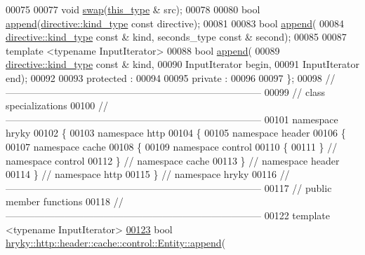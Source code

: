 \begin{DoxyCode}
00075 
00077     \textcolor{keywordtype}{void} \hyperlink{classhryky_1_1http_1_1header_1_1cache_1_1control_1_1_entity_afa2f3b06ff23758c01896c4bdfa81942}{swap}(\hyperlink{classhryky_1_1http_1_1header_1_1cache_1_1control_1_1_entity}{this_type} & src);
00078 
00080     \textcolor{keywordtype}{bool} \hyperlink{classhryky_1_1http_1_1header_1_1cache_1_1control_1_1_entity_ab9a90afb6b1ed5125e7e7648f910f8f7}{append}(\hyperlink{classhryky_1_1_kind}{directive::kind_type} \textcolor{keyword}{const} directive);
00081 
00083     \textcolor{keywordtype}{bool} \hyperlink{classhryky_1_1http_1_1header_1_1cache_1_1control_1_1_entity_ab9a90afb6b1ed5125e7e7648f910f8f7}{append}(
00084         \hyperlink{classhryky_1_1_kind}{directive::kind_type} \textcolor{keyword}{const} & kind, seconds\_type \textcolor{keyword}{const} & second);
00085 
00087     \textcolor{keyword}{template} <\textcolor{keyword}{typename} InputIterator>
00088     \textcolor{keywordtype}{bool} \hyperlink{classhryky_1_1http_1_1header_1_1cache_1_1control_1_1_entity_ab9a90afb6b1ed5125e7e7648f910f8f7}{append}(
00089         \hyperlink{classhryky_1_1_kind}{directive::kind_type} \textcolor{keyword}{const} & kind,
00090         InputIterator begin,
00091         InputIterator end);
00092 
00093 \textcolor{keyword}{protected} :
00094 
00095 \textcolor{keyword}{private} :
00096 
00097 \};
00098 \textcolor{comment}{//
      ------------------------------------------------------------------------------}
00099 \textcolor{comment}{// class specializations}
00100 \textcolor{comment}{//
      ------------------------------------------------------------------------------}
00101 \textcolor{keyword}{namespace }hryky
00102 \{
00103 \textcolor{keyword}{namespace }http
00104 \{
00105 \textcolor{keyword}{namespace }header
00106 \{
00107 \textcolor{keyword}{namespace }cache
00108 \{
00109 \textcolor{keyword}{namespace }control
00110 \{
00111 \} \textcolor{comment}{// namespace control}
00112 \} \textcolor{comment}{// namespace cache}
00113 \} \textcolor{comment}{// namespace header}
00114 \} \textcolor{comment}{// namespace http}
00115 \} \textcolor{comment}{// namespace hryky}
00116 \textcolor{comment}{//
      ------------------------------------------------------------------------------}
00117 \textcolor{comment}{// public member functions}
00118 \textcolor{comment}{//
      ------------------------------------------------------------------------------}
00122 \textcolor{comment}{}\textcolor{keyword}{template} <\textcolor{keyword}{typename} InputIterator>
\hypertarget{http__header__cache__control__entity_8h_source_l00123}{}\hyperlink{classhryky_1_1http_1_1header_1_1cache_1_1control_1_1_entity_a0f7d4ba0fcc97b1d1be6c8ba37581802}{00123} \textcolor{keywordtype}{bool} \hyperlink{classhryky_1_1http_1_1header_1_1cache_1_1control_1_1_entity_ab9a90afb6b1ed5125e7e7648f910f8f7}{hryky::http::header::cache::control::Entity::append}(

\end{DoxyCode}
